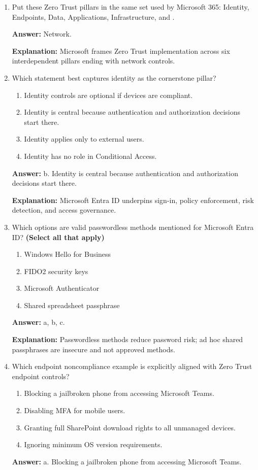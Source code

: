 \documentclass[10pt]{article}
\begin{document}
\begin{enumerate}[leftmargin=*]
\textbf{Explanation:} Defender for Identity analyzes identity-related traffic and suspicious behaviors tied to credential and directory attacks.

\item Put these Zero Trust pillars in the same set used by Microsoft 365: Identity, Endpoints, Data, Applications, Infrastructure, and \underline{\hspace{2cm}}.

\textbf{Answer:} Network.

\textbf{Explanation:} Microsoft frames Zero Trust implementation across six interdependent pillars ending with network controls.

\item Which statement best captures identity as the cornerstone pillar?
\begin{enumerate}[label=\alph*., leftmargin=1.5em]
\item Identity controls are optional if devices are compliant.
\item Identity is central because authentication and authorization decisions start there.
\item Identity applies only to external users.
\item Identity has no role in Conditional Access.
\end{enumerate}
\textbf{Answer:} b. Identity is central because authentication and authorization decisions start there.

\textbf{Explanation:} Microsoft Entra ID underpins sign-in, policy enforcement, risk detection, and access governance.

\item Which options are valid passwordless methods mentioned for Microsoft Entra ID? \textbf{(Select all that apply)}
\begin{enumerate}[label=\alph*., leftmargin=1.5em]
\item Windows Hello for Business
\item FIDO2 security keys
\item Microsoft Authenticator
\item Shared spreadsheet passphrase
\end{enumerate}
\textbf{Answer:} a, b, c.

\textbf{Explanation:} Passwordless methods reduce password risk; ad hoc shared passphrases are insecure and not approved methods.

\item Which endpoint noncompliance example is explicitly aligned with Zero Trust endpoint controls?
\begin{enumerate}[label=\alph*., leftmargin=1.5em]
\item Blocking a jailbroken phone from accessing Microsoft Teams.
\item Disabling MFA for mobile users.
\item Granting full SharePoint download rights to all unmanaged devices.
\item Ignoring minimum OS version requirements.
\end{enumerate}
\textbf{Answer:} a. Blocking a jailbroken phone from accessing Microsoft Teams.


\end{enumerate}
\end{document}
